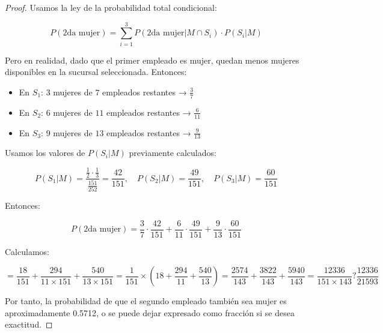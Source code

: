 \documentclass[11pt,letterpaper]{article}
\begin{document}
\begin{proof}
	Usamos la ley de la probabilidad total condicional:

	\[
	P(\text{2da mujer}) = 
	\sum_{i=1}^{3} P(\text{2da mujer} | M \cap S_i) \cdot P(S_i | M)
	\]

	Pero en realidad, dado que el primer empleado es mujer, quedan menos mujeres disponibles en la sucursal seleccionada. Entonces:

	\begin{itemize}
	    \item En \( S_1 \): $3$ mujeres de $7$ empleados restantes → \( \frac{3}{7} \)
	    \item En \( S_2 \): $6$ mujeres de $11$ empleados restantes → \( \frac{6}{11} \)
	    \item En \( S_3 \): $9$ mujeres de $13$ empleados restantes → \( \frac{9}{13} \)
	\end{itemize}

	Usamos los valores de \( P(S_i|M) \) previamente calculados:

	\[
	P(S_1|M) = \frac{\frac{1}{2} \cdot \frac{1}{3}}{\frac{151}{252}} = \frac{42}{151},\quad
	P(S_2|M) = \frac{49}{151},\quad
	P(S_3|M) = \frac{60}{151}
	\]

	Entonces:

	\[
	P(\text{2da mujer}) = \frac{3}{7} \cdot \frac{42}{151} + \frac{6}{11} \cdot \frac{49}{151} + \frac{9}{13} \cdot \frac{60}{151}
	\]

	Calculamos:

	\[
	= \frac{18}{151} + \frac{294}{11 \times 151} + \frac{540}{13 \times 151}
	= \frac{1}{151} \times (18 +\frac{294}{11} + \frac{540}{13})
        = \frac{2574}{143} + \frac{3822}{143} + \frac{5940}{143} = \frac{12336}{151 \times 143} ? \frac{12336}{21593}
	\]

	Por tanto, la probabilidad de que el segundo empleado también sea mujer es aproximadamente {0.5712}, o se puede dejar expresado como fracción si se desea exactitud.
\end{proof}
\end{document}
